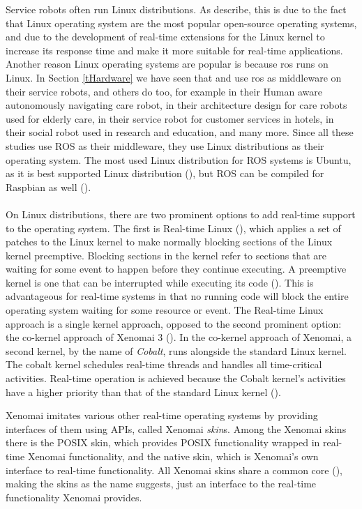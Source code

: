 \documentclass[12pt]{scrreprt}
\begin{document}
Service robots often run Linux distributions. As \citeauthor{delgado} describe, this is due to the fact that Linux operating system are the most popular open-source operating systems, and due to the development of real-time extensions for the Linux kernel to increase its response time and make it more suitable for real-time applications. Another reason Linux operating systems are popular is because \acrshort{ros} runs on Linux. In Section \ref{tHardware} we have seen that \cite{spencer} and \cite{delgado} use \acrshort{ros} as middleware on their service robots, and others do too, for example \cite{dimitris} in their Human aware autonomously navigating care robot, \cite{rosuser1} in their architecture design for care robots used for elderly care, \cite{intelligent_rosuser} in their service robot for customer services in hotels, \cite{rosbot_rosuser3} in their social robot used in research and education, and many more. Since all these studies use ROS as their middleware, they use Linux distributions as their operating system. The most used Linux distribution for ROS systems is Ubuntu, as it is best supported Linux distribution (\cite{foundation}), but ROS can be compiled for Raspbian as well (\cite{delgado}).
\\\\
On Linux distributions, there are two prominent options to add real-time support to the operating system. The first is Real-time Linux (\cite{rtwiki}), which applies a set of patches to the Linux kernel to make normally blocking sections of the Linux kernel preemptive. Blocking sections in the kernel refer to sections that are waiting for some event to happen before they continue executing. A preemptive kernel is one that can be interrupted while executing its code (\cite{blocking}). This is advantageous for real-time systems in that no running code will block the entire operating system waiting for some resource or event. The Real-time Linux approach is a single kernel approach, opposed to the second prominent option: the co-kernel approach of Xenomai 3 (\cite{xenomai}). In the co-kernel approach of Xenomai, a second kernel, by the name of \textit{Cobalt}, runs alongside the standard Linux kernel. The cobalt kernel schedules real-time threads and handles all time-critical activities. Real-time operation is achieved because the Cobalt kernel's activities have a higher priority than that of the standard Linux kernel (\cite{xenomai}).
\par
Xenomai imitates various other real-time operating systems by providing interfaces of them using APIs, called Xenomai \textit{skin}s. Among the Xenomai skins there is the POSIX skin, which provides POSIX functionality wrapped in real-time Xenomai functionality, and the native skin, which is Xenomai's own interface to real-time functionality. All Xenomai skins share a common core (\cite{faq}), making the skins as the name suggests, just an interface to the real-time functionality Xenomai provides.
\end{document}

